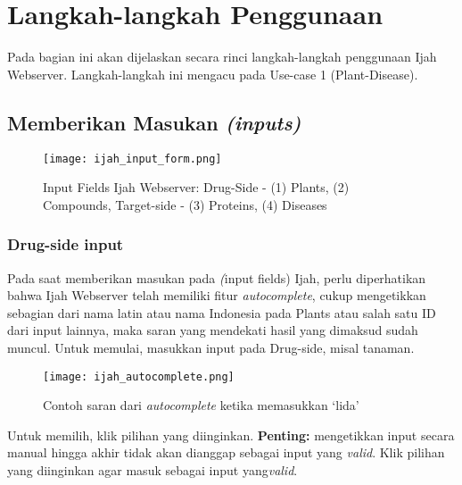 \chapter{Langkah-langkah Penggunaan}
Pada bagian ini akan dijelaskan secara rinci langkah-langkah penggunaan Ijah Webserver. Langkah-langkah ini mengacu pada Use-case 1 (Plant-Disease).

\section{Memberikan Masukan \emph{(inputs)}}

\begin{figure}[H]
	\centering
	\texttt{[image: ijah\_input\_form.png]}
	\caption{Input Fields Ijah Webserver: Drug-Side - (1) Plants, (2) Compounds, Target-side - (3) Proteins, (4) Diseases}
	\label{fig:ijah_input_form}
	\end{figure}

	\subsection{Drug-side input}
	Pada saat memberikan masukan pada \emph(input fields) Ijah, perlu diperhatikan bahwa Ijah Webserver telah memiliki fitur \emph{autocomplete}, cukup mengetikkan sebagian dari nama latin atau nama Indonesia pada Plants atau salah satu ID dari input lainnya, maka saran yang mendekati hasil yang dimaksud sudah muncul. Untuk memulai, masukkan input pada Drug-side, misal tanaman.

	\begin{figure}[H]
		\centering
		\texttt{[image: ijah\_autocomplete.png]}
		\caption{Contoh saran dari \emph{autocomplete} ketika memasukkan `lida'}
		\label{fig:ijah_autocomplete_click}
		\end{figure}

	Untuk memilih, klik pilihan yang diinginkan. \textbf{Penting:} mengetikkan input secara manual hingga akhir tidak akan dianggap sebagai input yang \emph{valid}. Klik pilihan yang diinginkan agar masuk sebagai input yang\emph{valid}.

